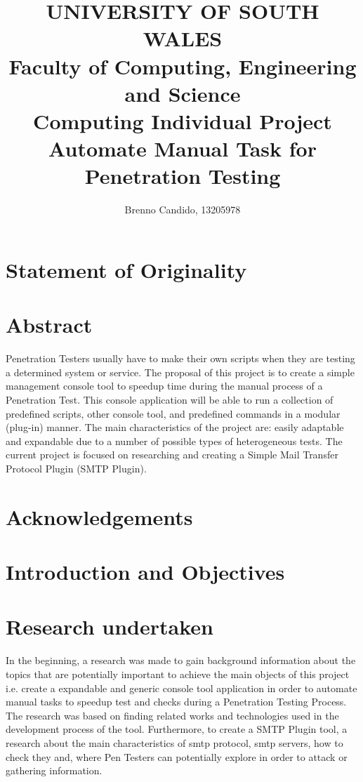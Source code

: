 \documentclass[a4paper, 12pt]{article}
\title {
			{\LARGE{\textbf{UNIVERSITY OF SOUTH WALES}}}\\
			{\large{\textsf{Faculty of Computing, Engineering and Science}}}\\
			{\large{\textsf{Computing Individual Project}}}\\
			\vspace{2.0cm}
			{\LARGE{\textbf{Automate Manual Task for Penetration Testing}}}
			\vspace{2.0cm}
}
\author { Brenno Candido, 13205978 } %
\begin{document}
\maketitle \clearpage
{}

\section*{Statement of Originality}

\clearpage

\section*{Abstract}

	Penetration Testers usually have to make their own scripts when they are testing a determined system or service. The proposal of this project is to
create a simple management console tool to speedup time during the manual process of a Penetration Test. This console application will be able to run a
collection of predefined scripts, other console tool, and predefined commands in a modular (plug-in) manner. The main characteristics of the project
are: easily adaptable and expandable due to a number of possible types of heterogeneous tests. The current project is focused on researching and
creating a Simple Mail Transfer Protocol Plugin (SMTP Plugin).\\

\clearpage

\section*{Acknowledgements}

\clearpage

\tableofcontents \clearpage
{}

\section{Introduction and Objectives}

\section{Research undertaken}

In the beginning, a research was made to gain background information about the topics that are potentially important to achieve the main objects of this project i.e. create a expandable and generic console tool application in order to automate manual tasks to speedup test and checks during a Penetration Testing Process. The research was based on finding related works and technologies used in the development process of the tool. Furthermore, to create a SMTP Plugin tool, a research about the main characteristics of smtp protocol, smtp servers, how to check they and, where Pen Testers can potentially explore in order to attack or gathering information.
\end{document}
